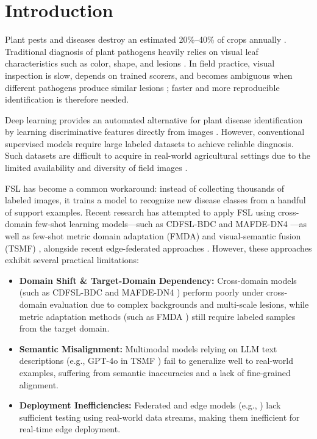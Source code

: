 \documentclass[conference]{IEEEtran}
\begin{document}
\section{Introduction}
Plant pests and diseases destroy an estimated 20\%--40\% of crops annually \cite{richard2022control}. Traditional diagnosis of plant pathogens heavily relies on visual leaf characteristics such as color, shape, and lesions \cite{khakimov2022traditional}. In field practice, visual inspection is slow, depends on trained scorers, and becomes ambiguous when different pathogens produce similar lesions \cite{shoaib2023advanced}; faster and more reproducible identification is therefore needed.

Deep learning provides an automated alternative for plant disease identification by learning discriminative features directly from images \cite{shoaib2023advanced}. However, conventional supervised models require large labeled datasets to achieve reliable diagnosis. Such datasets are difficult to acquire in real-world agricultural settings due to the limited availability and diversity of field images \cite{shoaib2023advanced, shafik2023systematic}.

FSL has become a common workaround: instead of collecting thousands of labeled images, it trains a model to recognize new disease classes from a handful of support examples. Recent research has attempted to apply FSL using cross-domain few-shot learning models---such as CDFSL-BDC \cite{yang2024laboratory} and MAFDE-DN4 \cite{zhao2024mafde}---as well as few-shot metric domain adaptation (FMDA) \cite{kudo2025few} and visual-semantic fusion (TSMF) \cite{zhou2026vsf}, alongside recent edge-federated approaches \cite{sharif2026real}. However, these approaches exhibit several practical limitations:
\begin{itemize}
    \item \textbf{Domain Shift \& Target-Domain Dependency:} Cross-domain models (such as CDFSL-BDC \cite{yang2024laboratory} and MAFDE-DN4 \cite{zhao2024mafde}) perform poorly under cross-domain evaluation due to complex backgrounds and multi-scale lesions, while metric adaptation methods (such as FMDA \cite{kudo2025few}) still require labeled samples from the target domain.
    \item \textbf{Semantic Misalignment:} Multimodal models relying on LLM text descriptions (e.g., GPT-4o in TSMF \cite{zhou2026vsf}) fail to generalize well to real-world examples, suffering from semantic inaccuracies and a lack of fine-grained alignment.
    \item \textbf{Deployment Inefficiencies:} Federated and edge models (e.g., \cite{sharif2026real}) lack sufficient testing using real-world data streams, making them inefficient for real-time edge deployment.
\end{itemize}
\end{document}
